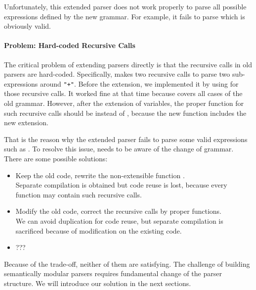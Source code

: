 
Unfortunately, this extended parser does not work properly to parse all possible expressions defined by the new grammar. For example, it fails to parse  which is obviously valid.

\paragraph{Problem: Hard-coded Recursive Calls} The critical problem of extending parsers directly is that the recursive calls in old parsers are hard-coded. Specifically,  makes two recursive calls to parse two sub-expressions around \lstinline{"+"}. Before the extension, we implemented it by using  for those recursive calls. It worked fine at that time because  covers all cases of the old grammar. However, after the extension of variables, the proper function for such recursive calls should be  instead of , because the new function  includes the new extension.

That is the reason why the extended parser fails to parse some valid expressions such as . To resolve this issue,  needs to be aware of the change of grammar. There are some possible solutions:

\begin{itemize}
    \item Keep the old code, rewrite the non-extensible function . \\Separate compilation is obtained but code reuse is lost, because every function may contain such recursive calls.
    \item Modify the old code, correct the recursive calls by proper functions. \\We can avoid duplication for code reuse, but separate compilation is sacrificed because of modification on the existing code.
    \item ??? 
\end{itemize}

Because of the trade-off, neither of them are satisfying. The challenge of building semantically modular parsers requires fundamental change of the parser structure. We will introduce our solution in the next sections.

